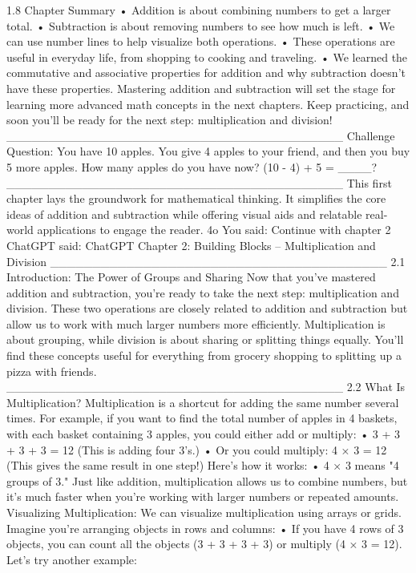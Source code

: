 1.8 Chapter Summary
•	Addition is about combining numbers to get a larger total.
•	Subtraction is about removing numbers to see how much is left.
•	We can use number lines to help visualize both operations.
•	These operations are useful in everyday life, from shopping to cooking and traveling.
•	We learned the commutative and associative properties for addition and why subtraction doesn’t have these properties.
Mastering addition and subtraction will set the stage for learning more advanced math concepts in the next chapters. Keep practicing, and soon you’ll be ready for the next step: multiplication and division!
________________________________________
Challenge Question:
You have 10 apples. You give 4 apples to your friend, and then you buy 5 more apples. How many apples do you have now?
(10 - 4) + 5 = ____?
________________________________________
This first chapter lays the groundwork for mathematical thinking. It simplifies the core ideas of addition and subtraction while offering visual aids and relatable real-world applications to engage the reader.
4o
You said:
Continue with chapter 2
ChatGPT said:
ChatGPT
Chapter 2: Building Blocks – Multiplication and Division
________________________________________
2.1 Introduction: The Power of Groups and Sharing
Now that you’ve mastered addition and subtraction, you’re ready to take the next step: multiplication and division. These two operations are closely related to addition and subtraction but allow us to work with much larger numbers more efficiently.
Multiplication is about grouping, while division is about sharing or splitting things equally. You’ll find these concepts useful for everything from grocery shopping to splitting up a pizza with friends.
________________________________________
2.2 What Is Multiplication?
Multiplication is a shortcut for adding the same number several times. For example, if you want to find the total number of apples in 4 baskets, with each basket containing 3 apples, you could either add or multiply:
•	3 + 3 + 3 + 3 = 12 (This is adding four 3’s.)
•	Or you could multiply: 4 × 3 = 12 (This gives the same result in one step!)
Here’s how it works:
•	4 × 3 means "4 groups of 3."
Just like addition, multiplication allows us to combine numbers, but it’s much faster when you’re working with larger numbers or repeated amounts.
Visualizing Multiplication: We can visualize multiplication using arrays or grids. Imagine you’re arranging objects in rows and columns:
•	If you have 4 rows of 3 objects, you can count all the objects (3 + 3 + 3 + 3) or multiply (4 × 3 = 12).
Let’s try another example:
